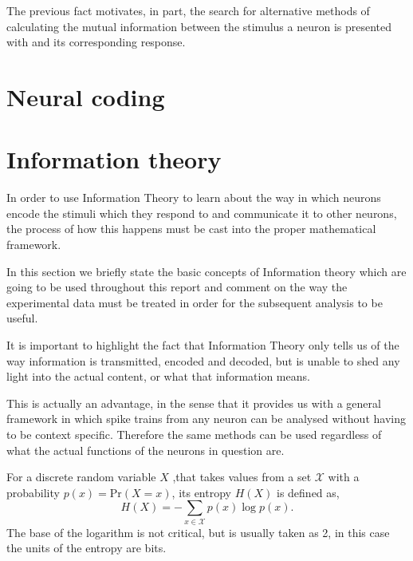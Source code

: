 \documentclass[10pt,a4paper]{book}
\begin{document}
The previous fact motivates, in part, the search for alternative methods of calculating the mutual information between the stimulus a neuron is presented with and its corresponding response.

\section{Neural coding} %




\section{Information theory}


In order to use Information Theory to learn about the way in which neurons encode the stimuli which they respond to and communicate it to other neurons, the process of how this happens must be cast into the proper mathematical framework.

In this section we briefly state the basic concepts of Information theory which are going to be used throughout this report and comment on the way the experimental data must be treated in order for the subsequent analysis to be useful.

It is important to highlight the fact that Information Theory only tells us of the way information is transmitted, encoded and decoded, but is unable to shed any light into the actual content, or what that information means. 

This is actually an advantage, in the sense that it provides us with a general framework in which spike trains from any neuron can be analysed without having to be context specific. Therefore the same methods can be used regardless of what the actual functions of the neurons in question are.


For a discrete random variable $X$ ,that takes values from a set $\mathcal{X}$ with a probability $p(x) = \text{Pr}(X = x)$, its entropy $H(X)$ is defined as,
\begin{equation}
H(X) = - \sum_{x \in \mathcal{X}} p(x) \log p(x).
\end{equation}
The base of the logarithm is not critical, but is usually taken as 2, in this case the units of the entropy are bits.
\end{document}
